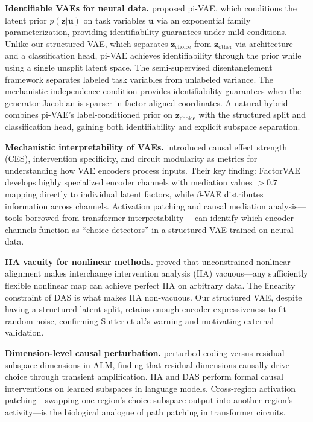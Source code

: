 \documentclass{article}
\begin{document}
\textbf{Identifiable VAEs for neural data.} \citet{zhou2020pivae} proposed pi-VAE, which conditions the latent prior $p(\mathbf{z}|\mathbf{u})$ on task variables $\mathbf{u}$ via an exponential family parameterization, providing identifiability guarantees under mild conditions. Unlike our structured VAE, which separates $\mathbf{z}_{\text{choice}}$ from $\mathbf{z}_{\text{other}}$ via architecture and a classification head, pi-VAE achieves identifiability through the prior while using a single unsplit latent space. The semi-supervised disentanglement framework \citep{narayanaswamy2017learning} separates labeled task variables from unlabeled variance. The mechanistic independence condition \citep{sid2026mechanistic} provides identifiability guarantees when the generator Jacobian is sparser in factor-aligned coordinates. A natural hybrid combines pi-VAE's label-conditioned prior on $\mathbf{z}_{\text{choice}}$ with the structured split and classification head, gaining both identifiability and explicit subspace separation.

\textbf{Mechanistic interpretability of VAEs.} \citet{martinez2025vae_circuits} introduced causal effect strength (CES), intervention specificity, and circuit modularity as metrics for understanding how VAE encoders process inputs. Their key finding: FactorVAE develops highly specialized encoder channels with mediation values $> 0.7$ mapping directly to individual latent factors, while $\beta$-VAE distributes information across channels. Activation patching and causal mediation analysis---tools borrowed from transformer interpretability \citep{geiger2024causal}---can identify which encoder channels function as ``choice detectors'' in a structured VAE trained on neural data.

\textbf{IIA vacuity for nonlinear methods.} \citet{sutter2025iia} proved that unconstrained nonlinear alignment makes interchange intervention analysis (IIA) vacuous---any sufficiently flexible nonlinear map can achieve perfect IIA on arbitrary data. The linearity constraint of DAS \citep{geiger2024causal} is what makes IIA non-vacuous. Our structured VAE, despite having a structured latent split, retains enough encoder expressiveness to fit random noise, confirming Sutter et al.'s warning and motivating external validation.

\textbf{Dimension-level causal perturbation.} \citet{pereira2025residual} perturbed coding versus residual subspace dimensions in ALM, finding that residual dimensions causally drive choice through transient amplification. IIA \citep{geiger2024finding} and DAS \citep{geiger2024causal} perform formal causal interventions on learned subspaces in language models. Cross-region activation patching---swapping one region's choice-subspace output into another region's activity---is the biological analogue of path patching in transformer circuits.
\end{document}
